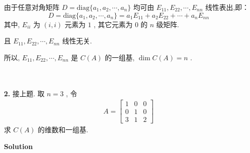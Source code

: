 \documentclass[11pt,a4paper,openany,oneside]{book}
\def\diag{\mathrm{diag}}
\newcommand\Solution{\noindent\textbf{\textsf{Solution}}\par\medskip}
\begin{document}
由于任意对角矩阵 $ D = \diag\{a_1, a_2, \cdots, a_n\} $ 均可由 $ E_{11},E_{22}, \cdots, E_{nn} $ 线性表出,即：
 $$  D = \diag\{a_1, a_2, \cdots, a_n\} = a_1E_{11} + a_2E_{22} + \cdots + a_nE_{nn}  $$ 
其中,  $ E_{ii} $ 为 $ (i,i) $ 元素为 $ 1 $ , 其它元素为 $ 0 $ 的 $ n $ 级矩阵.

且 $ E_{11}, E_{22}, \cdots,E_{nn} $ 线性无关.

所以,  $ E_{11}, E_{22}, \cdots,E_{nn} $ 是 $ C(A) $ 的一组基,  $ \dim C(A) = n $ . \\  \\  \\


\begin{myexample}
	\textbf{2.} 
接上题. 取 $ n=3 $ , 令
\begin{gather*}
A=
\begin{bmatrix}
1 & 0 & 0 \\
0 & 1 & 0 \\
3 & 1 & 2 
\end{bmatrix}
\end{gather*}
求 $ C(A) $ 的维数和一组基.  \\  

\end{myexample}
\Solution
\end{document}

